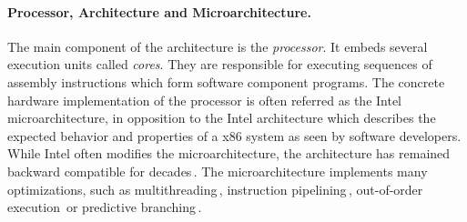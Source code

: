 \paragraph{Processor, Architecture and Microarchitecture.}
%
The main component of the architecture is the \emph{processor}.
%
It embeds several execution units called \emph{cores}.
%
They are responsible for executing sequences of assembly instructions which form
software component programs.
%
The concrete hardware implementation of the processor is often referred as the
Intel microarchitecture, in opposition to the Intel architecture which describes
the expected behavior and properties of a x86 system as seen by software
developers.
%
While Intel often modifies the microarchitecture, the architecture has remained
backward compatible for decades\,\cite{turley2014introx86}.
%
The microarchitecture implements many optimizations, such as
multithreading\,\cite{marr2002hypertheading}, instruction
pipelining\,\cite{fog2012microarchitecture}, out-of-order
execution\,\cite[Section 2]{fog2012microarchitecture} or predictive
branching\,\cite{milenkovic2002branchprediction}\cite[Section
3]{fog2012microarchitecture}.
%
%
